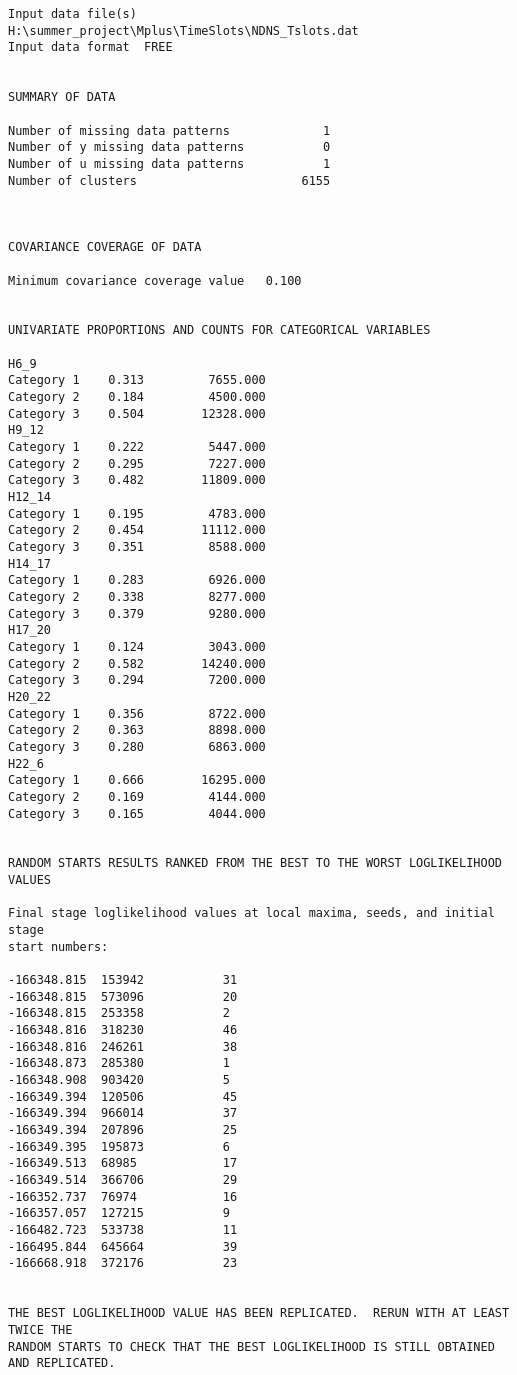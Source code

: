 \begin{verbatim}
Input data file(s)
H:\summer_project\Mplus\TimeSlots\NDNS_Tslots.dat
Input data format  FREE


SUMMARY OF DATA

Number of missing data patterns             1
Number of y missing data patterns           0
Number of u missing data patterns           1
Number of clusters                       6155



COVARIANCE COVERAGE OF DATA

Minimum covariance coverage value   0.100


UNIVARIATE PROPORTIONS AND COUNTS FOR CATEGORICAL VARIABLES

H6_9
Category 1    0.313         7655.000
Category 2    0.184         4500.000
Category 3    0.504        12328.000
H9_12
Category 1    0.222         5447.000
Category 2    0.295         7227.000
Category 3    0.482        11809.000
H12_14
Category 1    0.195         4783.000
Category 2    0.454        11112.000
Category 3    0.351         8588.000
H14_17
Category 1    0.283         6926.000
Category 2    0.338         8277.000
Category 3    0.379         9280.000
H17_20
Category 1    0.124         3043.000
Category 2    0.582        14240.000
Category 3    0.294         7200.000
H20_22
Category 1    0.356         8722.000
Category 2    0.363         8898.000
Category 3    0.280         6863.000
H22_6
Category 1    0.666        16295.000
Category 2    0.169         4144.000
Category 3    0.165         4044.000


RANDOM STARTS RESULTS RANKED FROM THE BEST TO THE WORST LOGLIKELIHOOD VALUES

Final stage loglikelihood values at local maxima, seeds, and initial stage 
start numbers:

-166348.815  153942           31
-166348.815  573096           20
-166348.815  253358           2
-166348.816  318230           46
-166348.816  246261           38
-166348.873  285380           1
-166348.908  903420           5
-166349.394  120506           45
-166349.394  966014           37
-166349.394  207896           25
-166349.395  195873           6
-166349.513  68985            17
-166349.514  366706           29
-166352.737  76974            16
-166357.057  127215           9
-166482.723  533738           11
-166495.844  645664           39
-166668.918  372176           23


THE BEST LOGLIKELIHOOD VALUE HAS BEEN REPLICATED.  RERUN WITH AT LEAST TWICE THE
RANDOM STARTS TO CHECK THAT THE BEST LOGLIKELIHOOD IS STILL OBTAINED AND REPLICATED.



\end{verbatim}
